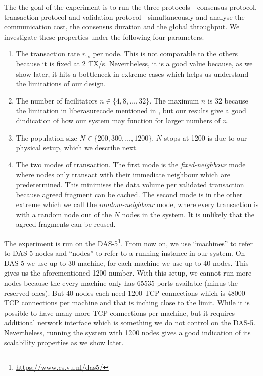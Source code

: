 The the goal of the experiment is to run the three protocols---consensus protocol,
transaction protocol and validation protocol---simultaneously and analyse the communication cost, the consensus duration and the global throughput.
We investigate these properties under the following four parameters.
\begin{enumerate}
  \item The transaction rate $r_{\text{tx}}$ per node. This is not comparable to the others because it is fixed at 2 TX/s.
        Nevertheless, it is a good value because, as we show later,
        it hits a bottleneck in extreme cases which helps us understand the limitations of our design.
  \item The number of facilitators $n \in \{4, 8, \dots, 32\}$.
        The maximum $n$ is 32 because the limitation in liberasurecode mentioned in ,
        but our results give a good dindication of how our system may function for larger numbers of $n$.
  \item The population size $N \in \{200, 300, \dots, 1200\}$.
        $N$ stops at 1200 is due to our physical setup, which we describe next.
  \item The two modes of transaction.
        The first mode is the \emph{fixed-neighbour} mode where nodes only transact with their immediate neighbour which are predetermined. 
        This minimises the data volume per validated transaction because agreed fragment can be cached.
        The second mode is in the other extreme which we call the \emph{random-neighbour} mode,
        where every transaction is with a random node out of the $N$ nodes in the system.
        It is unlikely that the agreed fragments can be reused.
\end{enumerate}

The experiment is run on the DAS-5\footnote{\url{https://www.cs.vu.nl/das5/}}.
From now on, we use ``machines'' to refer to DAS-5 nodes and ``nodes'' to refer to a running instance in our system.
On DAS-5 we use up to 30 machine, for each machine we use up to 40 nodes.
This gives us the aforementioned 1200 number.
With this setup, we cannot run more nodes because the every machine only has 65535 ports available (minus the reserved ones).
But 40 nodes each need 1200 TCP connections which is 48000 TCP connections per machine and that is inching close to the limit.
While it is possible to have many more TCP connections per machine,
but it requires additional network interface which is something we do not control on the DAS-5.
Nevertheless, running the system with 1200 nodes gives a good indication of its scalability properties as we show later.

